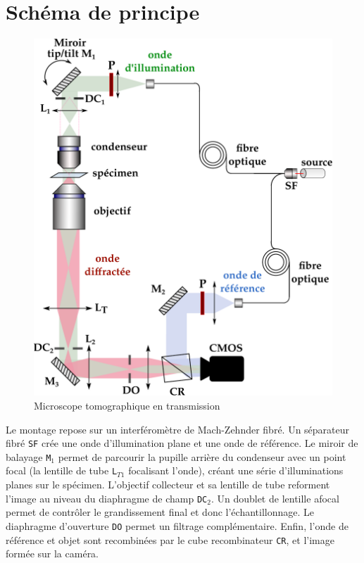 \documentclass[	french,DIV=calc,%
							paper=a4,%
							fontsize=11pt,%
							twocolumn]{scrartcl}	 					%
\newcommand{\code}[1]{\texttt{#1}}
\begin{document}
\section{Schéma de principe}
\begin{figure}[ht]
	\includegraphics[scale=0.36]{images/schema_manip2.pdf}
	\caption{Microscope tomographique en transmission}\label{schema_manip}
\end{figure}
Le montage repose sur un interféromètre de Mach-Zehnder fibré. Un séparateur fibré \code{SF} crée une onde d'illumination plane et une onde de référence. Le miroir de balayage \code{M$_1$} permet de parcourir la pupille arrière du condenseur avec un point focal (la lentille de tube \code{L$_{T1}$} focalisant l'onde), créant une série d'illuminations planes sur le spécimen. L'objectif collecteur et sa lentille de tube reforment l'image au niveau du diaphragme de champ \code{DC$_2$}. Un doublet de lentille afocal permet de contrôler le grandissement final et donc l'échantillonnage. Le diaphragme d'ouverture \code{DO} permet un filtrage complémentaire.   
Enfin, l'onde de référence et objet sont recombinées par le cube recombinateur \code{CR}, et l'image formée sur la caméra.
\end{document}

